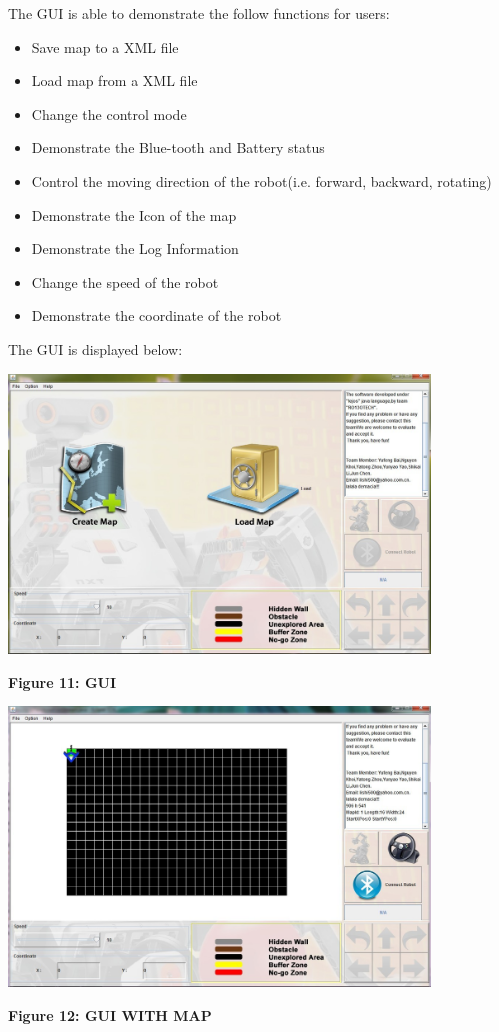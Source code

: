 \documentclass[11pt, a4paper]{report}
\begin{document}
The GUI is able to demonstrate the follow functions for users:
\begin{itemize}
\item Save map to a XML file
\item Load map from a XML file
\item Change the control mode
\item Demonstrate the Blue-tooth and Battery status
\item Control the moving direction of the robot(i.e. forward, backward, rotating)
\item Demonstrate the Icon of the map
\item Demonstrate the Log Information
\item Change the speed of the robot
\item Demonstrate the coordinate of the robot
\end{itemize}
The GUI is displayed below:
\pagebreak
\begin{center}
 \includegraphics[width=11.20cm]{GUI_Initial.jpg}
\end{center}
\begin{center}
\textbf {Figure 11: GUI} \\[0.3cm]
\end{center}
\begin{center}
 \includegraphics[width=11.20cm]{Map.jpg}
\end{center}
\begin{center}
\textbf {Figure 12: GUI WITH MAP} \\[0.3cm]
\end{center}
\end{document}

